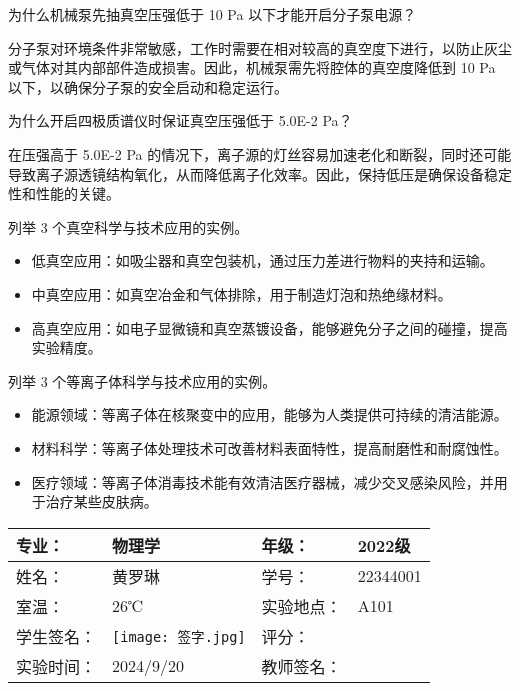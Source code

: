 \documentclass[dvipsnames, svgnames,a4paper,11pt]{article}
\begin{document}
\begin{question}
	为什么机械泵先抽真空压强低于 10 Pa 以下才能开启分子泵电源？
	\end{question}
	分子泵对环境条件非常敏感，工作时需要在相对较高的真空度下进行，以防止灰尘或气体对其内部部件造成损害。因此，机械泵需先将腔体的真空度降低到 10 Pa 以下，以确保分子泵的安全启动和稳定运行。
	
	\begin{question}
	为什么开启四极质谱仪时保证真空压强低于 5.0E-2 Pa？
	\end{question}
	在压强高于 5.0E-2 Pa 的情况下，离子源的灯丝容易加速老化和断裂，同时还可能导致离子源透镜结构氧化，从而降低离子化效率。因此，保持低压是确保设备稳定性和性能的关键。
	
	\begin{question}
	列举 3 个真空科学与技术应用的实例。
	\end{question}
	\begin{itemize}
		\item 低真空应用：如吸尘器和真空包装机，通过压力差进行物料的夹持和运输。
		\item 中真空应用：如真空冶金和气体排除，用于制造灯泡和热绝缘材料。
		\item 高真空应用：如电子显微镜和真空蒸镀设备，能够避免分子之间的碰撞，提高实验精度。
	\end{itemize}
	
	\begin{question}
	列举 3 个等离子体科学与技术应用的实例。
	\end{question}
	\begin{itemize}
		\item 能源领域：等离子体在核聚变中的应用，能够为人类提供可持续的清洁能源。
		\item 材料科学：等离子体处理技术可改善材料表面特性，提高耐磨性和耐腐蚀性。
		\item 医疗领域：等离子体消毒技术能有效清洁医疗器械，减少交叉感染风险，并用于治疗某些皮肤病。
	\end{itemize}
	
	
	\clearpage
	\begin{table}
		\renewcommand\arraystretch{1.7}
		\centering
		\begin{tabularx}{\textwidth}{|X|X|X|X|}
			\hline
			专业： & 物理学 & 年级： & 2022级 \\
			\hline
			姓名： &黄罗琳  & 学号： & 22344001\\
			\hline
			室温： & 26℃ & 实验地点： & A101 \\
			\hline
			学生签名：& \texttt{[image: 签字.jpg]} & 评分： &\\
			\hline
			实验时间：& 2024/9/20 & 教师签名：&\\
			\hline
		\end{tabularx}
	\end{table}
	
\end{document}
